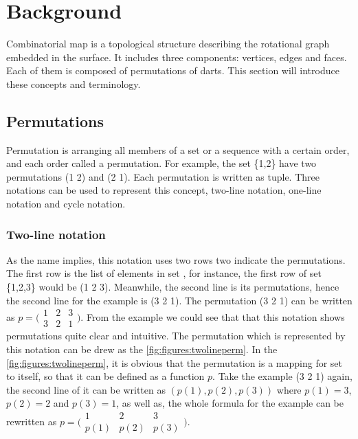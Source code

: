 
\chapter{Background}

Combinatorial map is a topological structure describing the rotational graph embedded in the surface. It includes three components: vertices, edges and faces. Each of them is composed of permutations of darts. This section will introduce these concepts and terminology.

\section{Permutations}

Permutation is arranging all members of a set or a sequence with a certain order, and each order called a permutation. For example, the set \{1,2\} have two permutations (1 2) and (2 1).  Each permutation is written as tuple. Three notations can be used to represent this concept, two-line notation, one-line notation and cycle notation.
%

\subsection*{Two-line notation}

As the name implies, this notation uses two rows two indicate the permutations. The first row is the list of elements in set , for instance, the first row of set \{1,2,3\} would be (1 2 3). Meanwhile, the second line is its permutations, hence the second line for the example is (3 2 1). The permutation (3 2 1) can be written as \(p=\bigl( 
  \begin{smallmatrix}
    1 & 2 & 3 \\
    3 & 2 & 1
   \end{smallmatrix}
   \bigr)\). From the example we could see that that this notation shows permutations quite clear and intuitive. The permutation which is represented by this notation can be drew as the \cref{fig:figures:twolineperm}. In the \cref{fig:figures:twolineperm}, it is obvious that the permutation is a mapping for set  to itself, so that it can be defined as a function \(p\). Take the example (3 2 1) again, the second line of it can be written as \((p(1),p(2),p(3))\) where \(p(1)=3\), \(p(2)=2\) and \(p(3)=1\), as well as, the whole formula for the example can be rewritten as \(p=\bigl( 
    \begin{smallmatrix}
      1 & 2 & 3 \\
      p(1) & p(2) & p(3)
     \end{smallmatrix}
     \bigr)\). 


